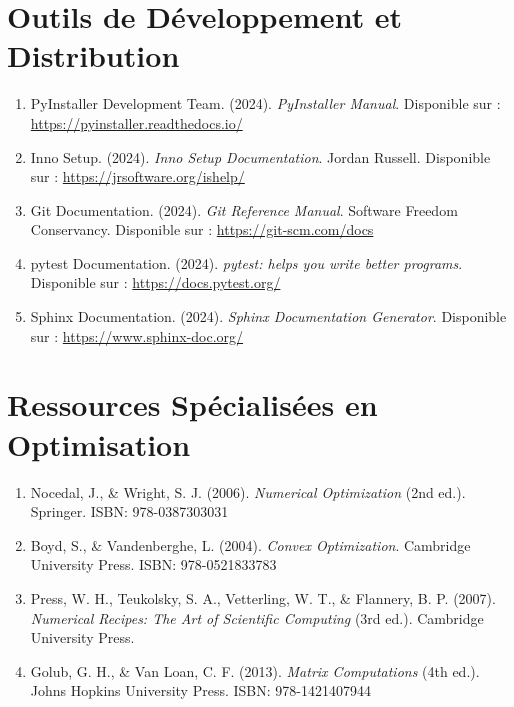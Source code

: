 \documentclass[12pt,a4paper]{report}
\begin{document}
\section{Outils de Développement et Distribution}

\begin{enumerate}
\item PyInstaller Development Team. (2024). \textit{PyInstaller Manual}. Disponible sur : \url{https://pyinstaller.readthedocs.io/}

\item Inno Setup. (2024). \textit{Inno Setup Documentation}. Jordan Russell. Disponible sur : \url{https://jrsoftware.org/ishelp/}

\item Git Documentation. (2024). \textit{Git Reference Manual}. Software Freedom Conservancy. Disponible sur : \url{https://git-scm.com/docs}

\item pytest Documentation. (2024). \textit{pytest: helps you write better programs}. Disponible sur : \url{https://docs.pytest.org/}

\item Sphinx Documentation. (2024). \textit{Sphinx Documentation Generator}. Disponible sur : \url{https://www.sphinx-doc.org/}
\end{enumerate}

\section{Ressources Spécialisées en Optimisation}

\begin{enumerate}
\item Nocedal, J., \& Wright, S. J. (2006). \textit{Numerical Optimization} (2nd ed.). Springer. ISBN: 978-0387303031

\item Boyd, S., \& Vandenberghe, L. (2004). \textit{Convex Optimization}. Cambridge University Press. ISBN: 978-0521833783

\item Press, W. H., Teukolsky, S. A., Vetterling, W. T., \& Flannery, B. P. (2007). \textit{Numerical Recipes: The Art of Scientific Computing} (3rd ed.). Cambridge University Press.

\item Golub, G. H., \& Van Loan, C. F. (2013). \textit{Matrix Computations} (4th ed.). Johns Hopkins University Press. ISBN: 978-1421407944
\end{enumerate}
\end{document}
